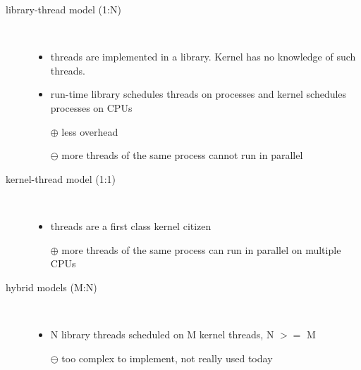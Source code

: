 \begin{slide}
\setlength{\baselineskip}{0.8\baselineskip}
\begin{description}
\item[library-thread model (1:N)]~\\\vspace{-2.5ex}
    \begin{itemize}
    \item threads are implemented in a library.  Kernel has no knowledge of
    such threads.
    \item run-time library schedules threads on processes and kernel schedules
    processes on CPUs
    \item[$\oplus$] less overhead
    \item[$\ominus$] more threads of the same process cannot run in parallel
    \end{itemize}
\item [kernel-thread model (1:1)]~\\\vspace{-2.5ex}
    \begin{itemize}
    \item threads are a first class kernel citizen
    \item[$\oplus$] more threads of the same process can run in parallel on
    multiple CPUs
    \end{itemize}
\item[hybrid models (M:N)]~\\\vspace{-2.5ex}
    \begin{itemize}
    \item N library threads scheduled on M kernel threads, N $>=$ M
    \item[$\ominus$] too complex to implement, not really used today
    \end{itemize}
\end{description}
\end{slide}

